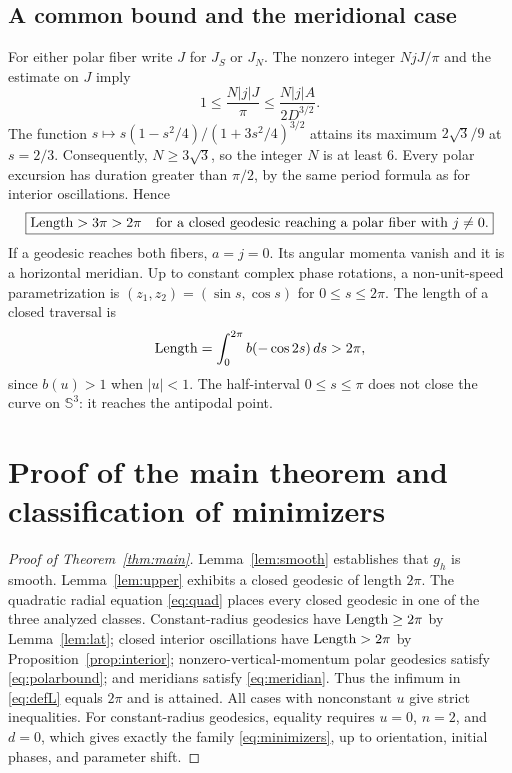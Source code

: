 \documentclass[11pt,a4paper]{article}
\theoremstyle{remark}\newtheorem{remark}[theorem]{Remark}
\newcommand{\Sthree}{\mathbb S^3}\newcommand{\R}{\mathbb R}\newcommand{\C}{\mathbb C}\newcommand{\Z}{\mathbb Z}
\begin{document}
\subsection{A common bound and the meridional case}
For either polar fiber write $J$ for $J_S$ or $J_N$. The nonzero integer $NjJ/\pi$ and the estimate on $J$ imply
\[
1\le\frac{N|j|J}{\pi}\le\frac{N|j|A}{2D^{3/2}}.
\]
The function $s\mapsto s(1-s^2/4)/(1+3s^2/4)^{3/2}$ attains its maximum $2\sqrt3/9$ at $s=2/3$. Consequently, $N\ge3\sqrt3$, so the integer $N$ is at least $6$. Every polar excursion has duration greater than $\pi/2$, by the same period formula as for interior oscillations. Hence
\begin{equation}\label{eq:polarbound}
\boxed{\operatorname{Length}>3\pi>2\pi\quad\text{for a closed geodesic reaching a polar fiber with }j\ne0.}
\end{equation}
If a geodesic reaches both fibers, $a=j=0$. Its angular momenta vanish and it is a horizontal meridian. Up to constant complex phase rotations, a non-unit-speed parametrization is $(z_1,z_2)=(\sin s,\cos s)$ for $0\le s\le2\pi$. The length of a closed traversal is
\begin{equation}\label{eq:meridian}
\operatorname{Length}=\int_0^{2\pi}b(-\cos2s)\,ds>2\pi,
\end{equation}
since $b(u)>1$ when $|u|<1$. The half-interval $0\le s\le\pi$ does not close the curve on $\Sthree$: it reaches the antipodal point.

\section{Proof of the main theorem and classification of minimizers}
\begin{proof}[Proof of Theorem~\ref{thm:main}]
Lemma~\ref{lem:smooth} establishes that $g_h$ is smooth. Lemma~\ref{lem:upper} exhibits a closed geodesic of length $2\pi$. The quadratic radial equation \eqref{eq:quad} places every closed geodesic in one of the three analyzed classes. Constant-radius geodesics have $\operatorname{Length}\ge2\pi$ by Lemma~\ref{lem:lat}; closed interior oscillations have $\operatorname{Length}>2\pi$ by Proposition~\ref{prop:interior}; nonzero-vertical-momentum polar geodesics satisfy \eqref{eq:polarbound}; and meridians satisfy \eqref{eq:meridian}. Thus the infimum in \eqref{eq:defL} equals $2\pi$ and is attained. All cases with nonconstant $u$ give strict inequalities. For constant-radius geodesics, equality requires $u=0$, $n=2$, and $d=0$, which gives exactly the family \eqref{eq:minimizers}, up to orientation, initial phases, and parameter shift.
\end{proof}
\end{document}
